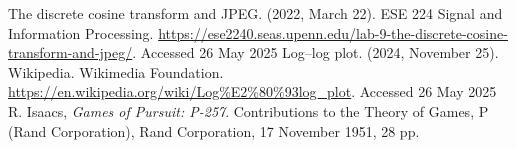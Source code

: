 \documentclass[10pt, twocolumn]{article}
\begin{document}
          \begin{thebibliography}{99}
             The discrete cosine transform and JPEG. (2022, March 22). ESE 224 Signal and Information Processing. \url{https://ese2240.seas.upenn.edu/lab-9-the-discrete-cosine-transform-and-jpeg/}. Accessed 26 May 2025
             Log–log plot. (2024, November 25). Wikipedia. Wikimedia Foundation. \url{https://en.wikipedia.org/wiki/Log%E2%80%93log_plot}. Accessed 26 May 2025
               R. Isaacs, \emph{Games of Pursuit: P-257}. Contributions to the Theory of Games, P (Rand Corporation), Rand Corporation, 17 November 1951, 28 pp.
            \end{thebibliography}
            
\end{document}
